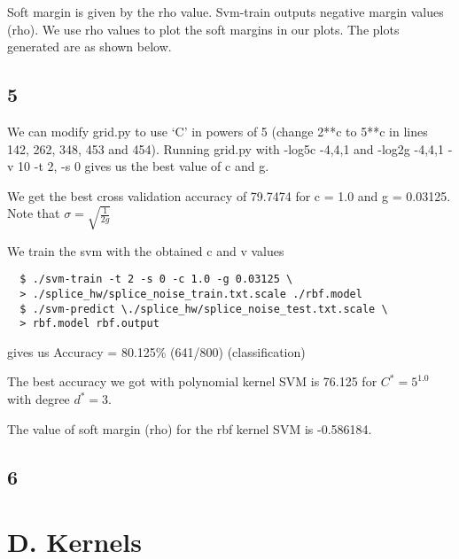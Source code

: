 \documentclass{article}
\begin{document}
Soft margin is given by the rho value.  Svm-train outputs negative margin values (rho). We use rho values to plot the soft margins in our plots.
The plots generated are as shown below.


\subsection*{5}
We can modify grid.py to use `C' in powers of 5 (change 2**c to 5**c in lines 142, 262, 348, 453 and 454).
Running grid.py with -log5c -4,4,1 and -log2g -4,4,1 -v 10 -t 2, -s 0 gives us the best value of c and g.

We get the best cross validation accuracy of 79.7474 for c = 1.0 and g = 0.03125.  Note that \( \sigma = \sqrt{\frac{1}{2g}} \)

We train the svm with the obtained c and v values
\begin{lstlisting}
  $ ./svm-train -t 2 -s 0 -c 1.0 -g 0.03125 \
  > ./splice_hw/splice_noise_train.txt.scale ./rbf.model
  $ ./svm-predict \./splice_hw/splice_noise_test.txt.scale \
  > rbf.model rbf.output
\end{lstlisting}
gives us Accuracy = 80.125\% (641/800) (classification)

The best accuracy we got with polynomial kernel SVM is 76.125 for \( C^{*} = 5^{1.0} \) with degree \( d^{*} = 3 \).

The value of soft margin (rho) for the rbf kernel SVM is -0.586184.

\subsection*{6}

\section*{D. Kernels}
\end{document}
